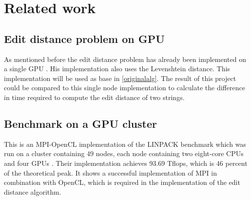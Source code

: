 \section{Related work}

\subsection{Edit distance problem on GPU}
As mentioned before the edit distance problem has already been implemented on a single GPU \cite{Heus}.
His implementation also uses the Levenshtein distance.
This implementation will be used as base in \cref{originalalg}.
The result of this project could be compared to this single node implementation to calculate the difference in time required to compute the edit distance of two strings.

\subsection{Benchmark on a GPU cluster}
This is an MPI-OpenCL implementation of the LINPACK benchmark which was run on a cluster containing 49 nodes, each node containing two eight-core CPUs and four GPUs \cite{Cluster}.
Their implementation achieves 93.69 Tflops, which is 46 percent of the theoretical peak.
It shows a successful implementation of MPI in combination with OpenCL, which is required in the implementation of the edit distance algorithm.
